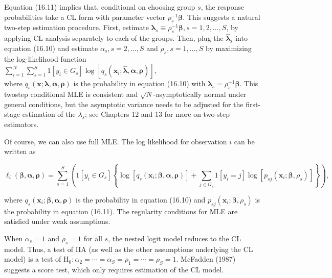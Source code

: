 \documentclass[10pt]{article}
\begin{document}
Equation (16.11) implies that, conditional on choosing group $s$, the response probabilities take a CL form with parameter vector $\rho_{s}^{-1} \boldsymbol{\beta}$. This suggests a natural two-step estimation procedure. First, estimate $\boldsymbol{\lambda}_{s} \equiv \rho_{s}^{-1} \boldsymbol{\beta}, s=1,2, \ldots, S$, by applying CL analysis separately to each of the groups. Then, plug the $\hat{\boldsymbol{\lambda}}_{s}$ into equation (16.10) and estimate $\alpha_{s}, s=2, \ldots, S$ and $\rho_{s}, s=1, \ldots, S$ by maximizing the log-likelihood function\\
$\sum_{i=1}^{N} \sum_{s=1}^{S} 1\left[y_{i} \in G_{s}\right] \log \left[q_{s}\left(\mathbf{x}_{i} ; \hat{\boldsymbol{\lambda}}, \boldsymbol{\alpha}, \boldsymbol{\rho}\right)\right]$,\\
where $q_{s}(\mathbf{x} ; \boldsymbol{\lambda}, \boldsymbol{\alpha}, \boldsymbol{\rho})$ is the probability in equation (16.10) with $\boldsymbol{\lambda}_{s}=\rho_{s}^{-1} \boldsymbol{\beta}$. This twostep conditional MLE is consistent and $\sqrt{N}$-asymptotically normal under general conditions, but the asymptotic variance needs to be adjusted for the first-stage estimation of the $\lambda_{s}$; see Chapters 12 and 13 for more on two-step estimators.

Of course, we can also use full MLE. The log likelihood for observation $i$ can be written as


\begin{equation*}
\ell_{i}(\boldsymbol{\beta}, \boldsymbol{\alpha}, \boldsymbol{\rho})=\sum_{s=1}^{S}\left(1\left[y_{i} \in G_{s}\right]\left\{\log \left[q_{s}\left(\mathbf{x}_{i} ; \boldsymbol{\beta}, \boldsymbol{\alpha}, \boldsymbol{\rho}\right)\right]+\sum_{j \in G_{s}} 1\left[y_{i}=j\right] \log \left[p_{s j}\left(\mathbf{x}_{i} ; \boldsymbol{\beta}, \rho_{s}\right)\right]\right\}\right), \tag{16.12}
\end{equation*}


where $q_{s}\left(\mathbf{x}_{i} ; \boldsymbol{\beta}, \boldsymbol{\alpha}, \boldsymbol{\rho}\right)$ is the probability in equation (16.10) and $p_{s j}\left(\mathbf{x}_{i} ; \boldsymbol{\beta}, \rho_{s}\right)$ is the probability in equation (16.11). The regularity conditions for MLE are satisfied under weak assumptions.

When $\alpha_{s}=1$ and $\rho_{s}=1$ for all $s$, the nested logit model reduces to the CL model. Thus, a test of IIA (as well as the other assumptions underlying the CL model) is a test of $\mathrm{H}_{0}: \alpha_{2}=\cdots=\alpha_{S}=\rho_{1}=\cdots=\rho_{S}=1$. McFadden (1987) suggests a score test, which only requires estimation of the CL model.
\end{document}

